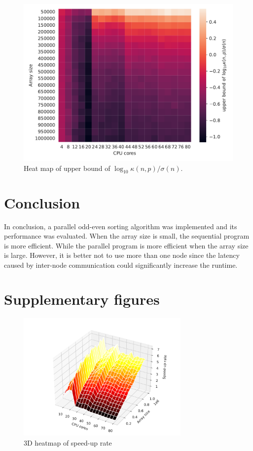 \documentclass[twoside,12pt]{article}
\theoremstyle{definition}
\theoremstyle{remark}
\begin{document}
\begin{figure}[ht!]
    \centering
    \includegraphics[width=\textwidth]{../analysis/ks_heatmap.pdf}
    \caption{Heat map of upper bound of $\log_{10}\kappa(n,p)/\sigma(n)$.}
    \label{fig:logks}
\end{figure}

\section{Conclusion}
In conclusion, a parallel odd-even sorting algorithm was implemented and
its performance was evaluated.
When the array size is small, the sequential program is more efficient.
While the parallel program is more efficient when the array size
is large.
However, it is better not to use more than one node since the latency
caused by inter-node communication could significantly increase the
runtime.



\newpage
\appendix

\newpage
\section{Supplementary figures}
\begin{figure}[H]
    \centering
    \includegraphics[width=0.75\textwidth]{../analysis/rate_heatmap_3d.pdf}
    \caption{3D heatmap of speed-up rate}
    \label{fig:rate-heat3d}
\end{figure}
\end{document}
